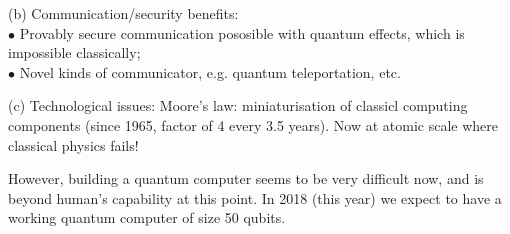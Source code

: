 \documentclass[a4paper]{article}
\begin{document}
(b) Communication/security benefits:\\
$\bullet$ Provably secure communication pososible with quantum effects, which is impossible classically;\\
$\bullet$ Novel kinds of communicator, e.g. quantum teleportation, etc.

(c) Technological issues: Moore's law: miniaturisation of classicl computing components (since 1965, factor of 4 every 3.5 years). Now at atomic scale where classical physics fails!

However, building a quantum computer seems to be very difficult now, and is beyond human's capability at this point. In 2018 (this year) we expect to have a working quantum computer of size 50 qubits.
\end{document}
